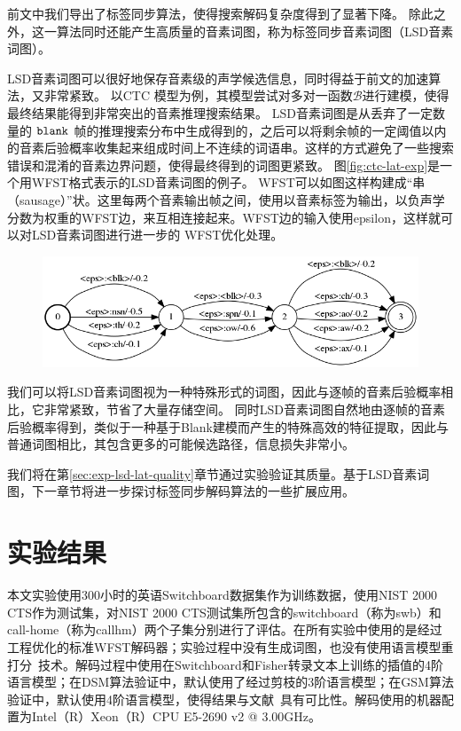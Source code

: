 前文中我们导出了标签同步算法，使得搜索解码复杂度得到了显著下降。
除此之外，这一算法同时还能产生高质量的音素词图，称为标签同步音素词图（LSD音素词图）。

LSD音素词图可以很好地保存音素级的声学候选信息，同时得益于前文的加速算法，又非常紧致。
%
以CTC 模型为例，其模型尝试对多对一函数$\mathcal{B}$进行建模，使得最终结果能得到非常突出的音素推理搜索结果。
LSD音素词图是从丢弃了一定数量的 $\tt blank$ 帧的推理搜索分布中生成得到的，之后可以将剩余帧的一定阈值以内的音素后验概率收集起来组成时间上不连续的词语串。这样的方式避免了一些搜索错误和混淆的音素边界问题，使得最终得到的词图更紧致。
%
图\ref{fig:ctc-lat-exp}是一个用WFST格式表示的LSD音素词图的例子。
WFST可以如图这样构建成“串（sausage）”状。这里每两个音素输出帧之间，使用以音素标签为输出，以负声学分数为权重的WFST边，来互相连接起来。WFST边的输入使用epsilon，这样就可以对LSD音素词图进行进一步的 WFST优化处理。

\begin{figure}[!htp]
  \centering
    \captionstyle{\centering}
    \includegraphics[width=\textwidth]{figure/ctc_lat.png}
\end{figure}

我们可以将LSD音素词图视为一种特殊形式的词图，因此与逐帧的音素后验概率相比，它非常紧致，节省了大量存储空间。
同时LSD音素词图自然地由逐帧的音素后验概率得到，类似于一种基于Blank建模而产生的特殊高效的特征提取，因此与普通词图相比，其包含更多的可能候选路径，信息损失非常小。

我们将在第\ref{sec:exp-lsd-lat-quality}章节通过实验验证其质量。基于LSD音素词图，下一章节将进一步探讨标签同步解码算法的一些扩展应用。

\section{实验结果}
\label{chap:lsd-exp}

本文实验使用300小时的英语Switchboard数据集作为训练数据\cite{godfrey1992switchboard}，使用NIST 2000 CTS作为测试集，对NIST 2000 CTS测试集所包含的switchboard（称为swb）和call-home（称为callhm）两个子集分别进行了评估。在所有实验中使用的是经过工程优化的标准WFST解码器；实验过程中没有生成词图，也没有使用语言模型重打分~\cite{povey2012generating}技术。解码过程中使用在Switchboard和Fisher转录文本上训练的插值的4阶语言模型；在DSM算法验证中，默认使用了经过剪枝的3阶语言模型；在GSM算法验证中，默认使用4阶语言模型，使得结果与文献~\cite{povey2016purely}具有可比性。解码使用的机器配置为Intel（R）Xeon（R）CPU E5-2690 v2 @ 3.00GHz。

